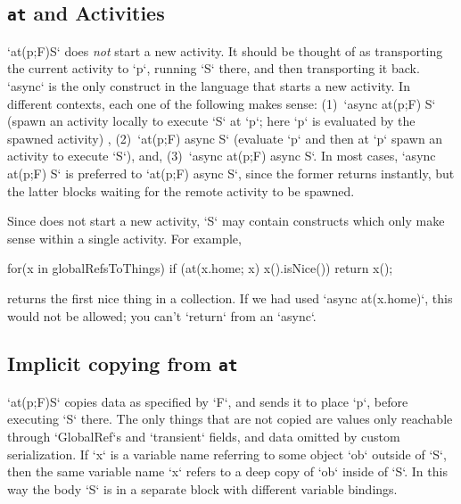 \subsection{{\tt at} and Activities}
\xcd`at(p;F)S` does {\em not} start a new activity.  It should be thought of as
transporting the current activity to \xcd`p`, running \xcd`S` there, and then
transporting it back.  \xcd`async` is the only construct in the
language that starts a new activity. In different contexts, each one
of the following makes sense:
(1)~\xcd`async at(p;F) S` (spawn an activity locally to execute \xcd`S` at
\xcd`p`; here \xcd`p` is evaluated by the spawned activity) , 
(2)~\xcd`at(p;F) async S` (evaluate \xcd`p` and then at \xcd`p` spawn an
activity to execute \xcd`S`), and,
(3)~\xcd`async at(p;F) async S`. 
In most cases, \xcd`async at(p;F) S` is preferred to \xcd`at(p;F) async S`, since
the former returns instantly, but the latter blocks waiting for the remote
activity to be spawned. 

Since  does not start a new activity, 
\xcd`S` may contain constructs which only make sense
within a single activity.  
For example, 
\begin{xten}
    for(x in globalRefsToThings) 
      if (at(x.home; x) x().isNice()) 
        return x();
\end{xten}
returns the first nice thing in a collection.   If we had used 
\xcd`async at(x.home)`, this would not be allowed; 
you can't \xcd`return` from an
\xcd`async`. 




\subsection{Implicit copying from {\tt at} }

\xcd`at(p;F)S` copies data as specified by \xcd`F`, and sends it
to place \xcd`p`, before executing \xcd`S` there. The only things that are not
copied are values only reachable through \xcd`GlobalRef`s and \xcd`transient`
fields, and data omitted by custom serialization.    If \xcd`x` is a
variable name referring to some object \xcd`ob` outside of \xcd`S`, then the
same variable name \xcd`x` refers to a deep copy of \xcd`ob`
inside of \xcd`S`.  In this way the body \xcd`S` is in a separate block with
different variable bindings.

